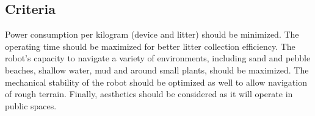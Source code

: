 \subsection{Criteria}

Power consumption per kilogram (device and litter) should be minimized.
The operating time should be maximized for better litter collection efficiency.
The robot's capacity to navigate a variety of environments, including sand and pebble beaches, shallow water, mud and around small plants, should be maximized.
The mechanical stability of the robot should be optimized as well to allow navigation of rough terrain.
Finally, aesthetics should be considered as it will operate in public spaces.